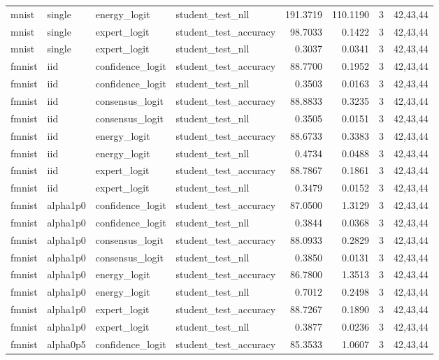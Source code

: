 \begin{tabular}{llllrrrl}
mnist & single & energy\_logit & student\_test\_nll & 191.3719 & 110.1190 & 3 & 42,43,44 \\
mnist & single & expert\_logit & student\_test\_accuracy & 98.7033 & 0.1422 & 3 & 42,43,44 \\
mnist & single & expert\_logit & student\_test\_nll & 0.3037 & 0.0341 & 3 & 42,43,44 \\
fmnist & iid & confidence\_logit & student\_test\_accuracy & 88.7700 & 0.1952 & 3 & 42,43,44 \\
fmnist & iid & confidence\_logit & student\_test\_nll & 0.3503 & 0.0163 & 3 & 42,43,44 \\
fmnist & iid & consensus\_logit & student\_test\_accuracy & 88.8833 & 0.3235 & 3 & 42,43,44 \\
fmnist & iid & consensus\_logit & student\_test\_nll & 0.3505 & 0.0151 & 3 & 42,43,44 \\
fmnist & iid & energy\_logit & student\_test\_accuracy & 88.6733 & 0.3383 & 3 & 42,43,44 \\
fmnist & iid & energy\_logit & student\_test\_nll & 0.4734 & 0.0488 & 3 & 42,43,44 \\
fmnist & iid & expert\_logit & student\_test\_accuracy & 88.7867 & 0.1861 & 3 & 42,43,44 \\
fmnist & iid & expert\_logit & student\_test\_nll & 0.3479 & 0.0152 & 3 & 42,43,44 \\
fmnist & alpha1p0 & confidence\_logit & student\_test\_accuracy & 87.0500 & 1.3129 & 3 & 42,43,44 \\
fmnist & alpha1p0 & confidence\_logit & student\_test\_nll & 0.3844 & 0.0368 & 3 & 42,43,44 \\
fmnist & alpha1p0 & consensus\_logit & student\_test\_accuracy & 88.0933 & 0.2829 & 3 & 42,43,44 \\
fmnist & alpha1p0 & consensus\_logit & student\_test\_nll & 0.3850 & 0.0131 & 3 & 42,43,44 \\
fmnist & alpha1p0 & energy\_logit & student\_test\_accuracy & 86.7800 & 1.3513 & 3 & 42,43,44 \\
fmnist & alpha1p0 & energy\_logit & student\_test\_nll & 0.7012 & 0.2498 & 3 & 42,43,44 \\
fmnist & alpha1p0 & expert\_logit & student\_test\_accuracy & 88.7267 & 0.1890 & 3 & 42,43,44 \\
fmnist & alpha1p0 & expert\_logit & student\_test\_nll & 0.3877 & 0.0236 & 3 & 42,43,44 \\
fmnist & alpha0p5 & confidence\_logit & student\_test\_accuracy & 85.3533 & 1.0607 & 3 & 42,43,44 \\

\end{tabular}
